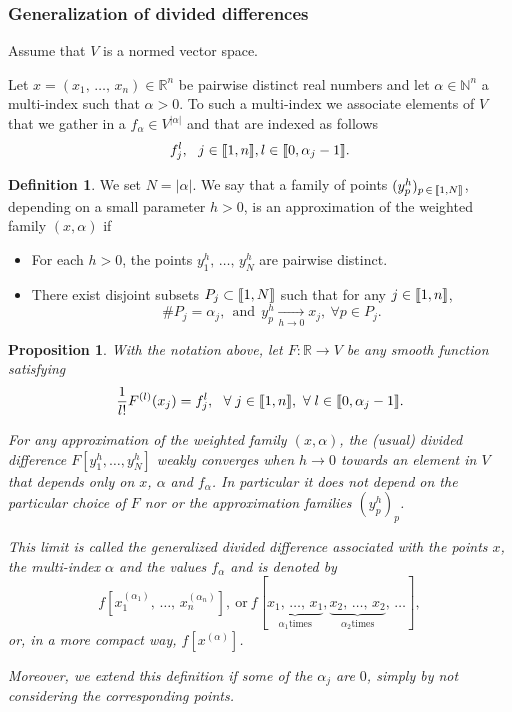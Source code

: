 \documentclass[11pt]{article}
\newtheorem{prop}[theo]{Proposition}
\theoremstyle{definition}
\newtheorem{defi}[theo]{Definition}
\numberwithin{equation}{section}
\numberwithin{figure}{section}
\numberwithin{table}{section}
\newcommand{\llbracket}{\mathopen{[\mkern -2.7mu[}}
\newcommand{\rrbracket}{\mathclose{]\mkern -2.7mu]}}
\newcommand{\inter}[2]{\llbracket #1,#2 \rrbracket}
\newcommand{\N}{\mathbb{N}}
\newcommand{\R}{\mathbb{R}}
\let\oldforall\forall
\renewcommand*{\forall}{\mathrel{\oldforall}}
\begin{document}
\subsubsection{Generalization of divided differences} \label{Subsec:Annexe_DD_generalisees}

Assume that $V$ is a normed vector space.

Let $x=(x_1,\,\dotsc,\,x_n)\in \R^n$ be pairwise distinct real numbers and let $\alpha\in \N^n$ a multi-index such that $\alpha>0$. To such a multi-index we associate elements of $V$ that we gather in a $f_\alpha\in V^{|\alpha|}$ and that are indexed as follows
\[
f_j^l, \ \ j\in \inter{1}{n}, l\in \inter{0}{\alpha_j-1}.
\]



\begin{defi}\label{Def:approximation_weighted_family}
We set $N=|\alpha|$. We say that a family of points $(y_p^h)_{p\,\in\, \inter{1}{N}}$, depending on a small parameter $h>0$, is an approximation of the weighted family $(x,\alpha)$ if
\begin{itemize}
\item For each $h>0$, the points $y_1^h,\,\dotsc,\,y_N^h$ are pairwise distinct.
\item There exist disjoint subsets $P_j\subset \inter{1}{N}$ such that for any $j\in \inter{1}{n}$,
\[
\# P_j = \alpha_j, \ \ \text{and} \ \ y_p^h\xrightarrow[h\to 0]{} x_j,\ \forall p\in P_j.
\]
\end{itemize}
\end{defi}

\begin{prop}\label{Prop:generalised_div_diff}
With the notation above, let $F:\R\to V$ be any smooth function satisfying
\begin{equation}\label{proprietes_F}
\frac{1}{l!} F^{(l)}(x_j) = f_j^l, \ \ \forall j\in \inter{1}{n}, \ \forall l\in \inter{0}{\alpha_j-1}.
\end{equation}

For any approximation of the weighted family $(x,\alpha)$, the (usual) divided difference $F[y_1^h,\dotsc,y_N^h]$ weakly converges when $h\to 0$ towards an element in $V$ that depends only on $x$, $\alpha$ and $f_\alpha$. In particular it does not depend on the particular choice of $F$ nor or the approximation families $(y_p^h)_p$.

This limit is called the generalized divided difference associated with the points $x$, the multi-index $\alpha$ and the values $f_\alpha$ and is denoted by
\[
f[x_1^{(\alpha_1)},\,\dotsc,\,x_n^{(\alpha_n)}], \ \text{or} \ f[\underbrace{x_1,\,\dotsc,\,x_1}_{\alpha_1 \text{times}},\underbrace{x_2,\,\dotsc,\,x_2}_{\alpha_2 \text{times}},\,\dotsc],
\]
or, in a more compact way, $f[x^{(\alpha)}]$.

Moreover, we extend this definition if some of the $\alpha_j$ are $0$, simply by not considering the corresponding points.
\end{prop}
\end{document}
